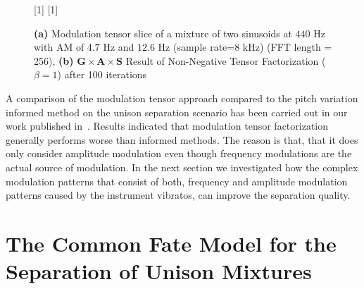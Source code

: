 \begin{figure}[!h]
\centering
[1\textwidth]{}%
\hspace{0.3\textwidth} %
[1\textwidth]{}%
\caption{\textbf{(a)} Modulation tensor slice of a mixture of two sinusoids at $440$ Hz with AM of $4.7$ Hz and $12.6$ Hz (sample rate=$8$ kHz)  (FFT length = 256), \textbf{(b)}  $\mathbf{G} \times \mathbf{A} \times \mathbf{S} $ Result of Non-Negative Tensor Factorization ($\beta = 1$) after 100 iterations}
\label{fig:am_ntf}
\end{figure}
\par
A comparison of the modulation tensor approach compared to the pitch variation informed method on the unison separation scenario has been carried out in our work published in~\cite{stoeter14}.
Results indicated that modulation tensor factorization generally performs worse than informed methods.
The reason is that, that it does only consider amplitude modulation even though frequency modulations are the actual source of modulation.
In the next section we investigated how the complex modulation patterns that consist of both, frequency and amplitude modulation patterns caused by the instrument vibratos, can improve the separation quality.

\section{The Common Fate Model for the Separation of Unison Mixtures}


